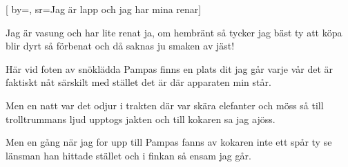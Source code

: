 
[
	by={},
	sr={Jag är lapp och jag har mina renar}]

\beginverse*
Jag är vasung och har lite renat
ja, om hembränt så tycker jag bäst
ty att köpa blir dyrt så förbenat
och då saknas ju smaken av jäst!
\endverse

\beginverse*
Här vid foten av snöklädda Pampas
finns en plats dit jag går varje vår
det är faktiskt nåt särskilt med stället
det är där apparaten min står.
\endverse

\beginverse*
Men en natt var det odjur i trakten
där var skära elefanter och möss
så till trolltrummans ljud upptogs jakten
och till kokaren sa jag ajöss.
\endverse

\beginverse*
Men en gång när jag for upp till Pampas
fanns av kokaren inte ett spår
ty se länsman han hittade stället
och i finkan så ensam jag går.
\endverse
\endsong